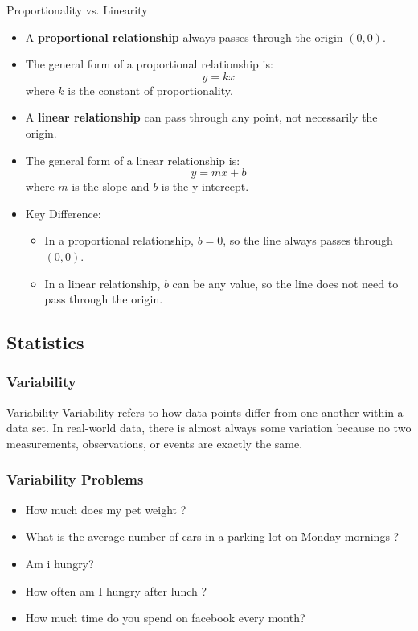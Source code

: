 \documentclass{beamer}
\begin{document}
\begin{frame}{Proportionality vs. Linearity}
    \begin{itemize}
        \item A \textbf{proportional relationship} always passes through the origin \((0, 0)\).
        \item The general form of a proportional relationship is:
        \[
        y = kx
        \]
        where \(k\) is the constant of proportionality.
        
        \item A \textbf{linear relationship} can pass through any point, not necessarily the origin.
        \item The general form of a linear relationship is:
        \[
        y = mx + b
        \]
        where \(m\) is the slope and \(b\) is the y-intercept.
        
        \item Key Difference:
        \begin{itemize}
            \item In a proportional relationship, \(b = 0\), so the line always passes through \((0, 0)\).
            \item In a linear relationship, \(b\) can be any value, so the line does not need to pass through the origin.
        \end{itemize}
    \end{itemize}
\end{frame}


\subsection{Statistics}
\begin{frame}
    \frametitle{Variability}
    \begin{block}{Variability}
        Variability refers to how data points differ from one another within a data set. In real-world data, there is almost always some variation because no two measurements, observations, or events are exactly the same.
    \end{block}
\end{frame}

\begin{frame}
    \frametitle{Variability Problems}
        \begin{itemize}
            \item How much does my pet weight ?
            \item What is the average number of cars in a parking lot on Monday mornings ?
            \item Am i hungry?
            \item How often am I hungry after lunch ? 
            \item How much time do you spend on facebook every month? 
        \end{itemize}
\end{frame}
\end{document}
